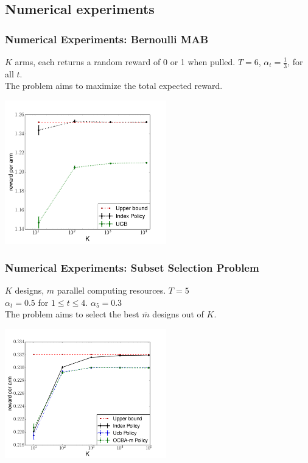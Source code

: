\documentclass{beamer}
\begin{document}
\subsection{Numerical experiments}
\begin{frame}[plain]
\tableofcontents[currentsubsection]
\end{frame}
\begin{frame}[plain]
\frametitle{Numerical Experiments: Bernoulli MAB}
$K$ arms, each returns a random reward of 0 or 1 when pulled. $T=6$, $\alpha_t=\frac{1}{3}$, for all $t$.\\
The problem aims to maximize the total expected reward.
\begin{center}
\includegraphics[width=70mm]{plot_mab.pdf}
\end{center}

\end{frame}

\begin{frame}[plain]
\frametitle{Numerical Experiments: Subset Selection Problem}
$K$ designs, $m$ parallel computing resources. $T=5$\\
$\alpha_t = 0.5$ for $1\leq t\leq 4$. $\alpha_5=0.3$\\
The problem aims to select the best $\bar{m}$ designs out of $K$.
\begin{center}
\includegraphics[width=70mm]{plot_hiring1.pdf}
\end{center}
\end{frame}
\end{document}
